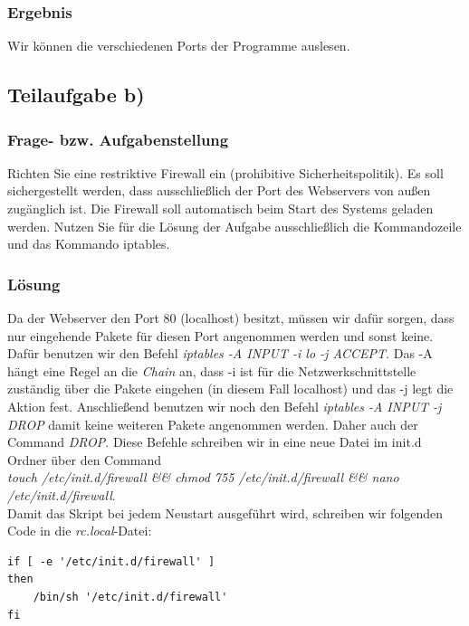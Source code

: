 \subsubsection{Ergebnis}

Wir können die verschiedenen Ports der Programme auslesen.

\subsection{Teilaufgabe b)} \cite{1,2}

\subsubsection{Frage- bzw. Aufgabenstellung}

Richten Sie eine restriktive Firewall ein (prohibitive Sicherheitspolitik). Es soll sichergestellt werden, dass ausschließlich der Port des Webservers von außen zugänglich ist. Die Firewall soll automatisch beim Start des Systems geladen werden. Nutzen Sie für die Lösung der Aufgabe ausschließlich die Kommandozeile und das Kommando iptables. 

\subsubsection{Lösung}

Da der Webserver den Port 80 (localhost) besitzt, müssen wir dafür sorgen, dass nur eingehende Pakete für diesen Port angenommen werden und sonst keine. Dafür benutzen wir den Befehl \textit{iptables -A INPUT -i lo -j ACCEPT}. Das -A hängt eine Regel an die \textit{Chain} an, dass -i ist für die Netzwerkschnittstelle zuständig über die Pakete eingehen (in diesem Fall localhost) und das -j legt die Aktion fest. Anschließend benutzen wir noch den Befehl \textit{iptables -A INPUT -j DROP} damit keine weiteren Pakete angenommen werden. Daher auch der Command \textit{DROP}. Diese Befehle schreiben wir in eine neue Datei im init.d Ordner über den Command \\
\textit{touch /etc/init.d/firewall \&\& chmod 755 /etc/init.d/firewall \&\& nano /etc/init.d/firewall}. \\ Damit das Skript bei jedem Neustart ausgeführt wird, schreiben wir folgenden Code in die \textit{rc.local}-Datei:

\begin{lstlisting}[caption={rc.local}]
if [ -e '/etc/init.d/firewall' ]
then
    /bin/sh '/etc/init.d/firewall'
fi
\end{lstlisting}

